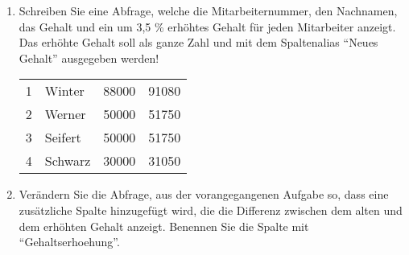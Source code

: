 \begin{enumerate}
\begin{center}
\begin{small}
\begin{msoraclesql}
\begin{supertabular}{l}
              \end{supertabular}
            \end{msoraclesql}
          \end{small}
        \end{center}
        \item Schreiben Sie eine Abfrage, welche die Mitarbeiternummer, den
        Nachnamen, das Gehalt und ein um 3,5 \% erh\"ohtes Gehalt f\"ur jeden
        Mitarbeiter anzeigt. Das erh\"ohte Gehalt soll als ganze Zahl und mit
        dem Spaltenalias \enquote{Neues Gehalt} ausgegeben werden!
        \begin{center}
          \begin{small}
            \tablehead{}
            \begin{msoraclesql}
              \begin{supertabular}{rlrr}
                1 & Winter & 88000 & 91080 \\
                2 & Werner & 50000 & 51750 \\
                3 & Seifert & 50000 & 51750 \\
                4 & Schwarz & 30000 & 31050 \\
              \end{supertabular}
            \end{msoraclesql}
          \end{small}
        \end{center}
        \item Ver\"andern Sie die Abfrage, aus der vorangegangenen Aufgabe so,
        dass eine zus\"atzliche Spalte hinzugef\"ugt wird, die die Differenz
        zwischen dem alten und dem erh\"ohten Gehalt anzeigt. Benennen Sie die
        Spalte mit \enquote{Gehaltserhoehung}.
        \begin{center}

\end{center}
\end{enumerate}
